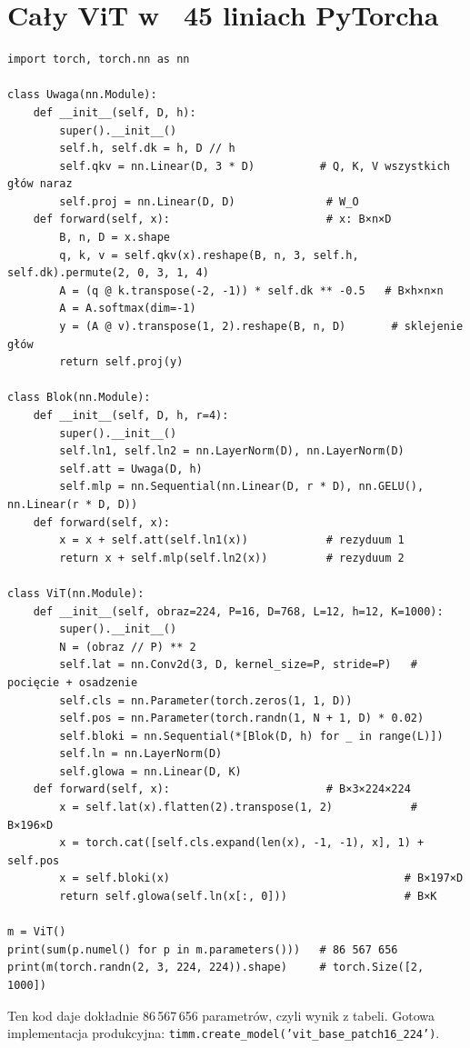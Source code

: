 \documentclass[11pt,a4paper]{article}
\begin{document}
\section{Cały ViT w ~45 liniach PyTorcha}
\begin{lstlisting}
import torch, torch.nn as nn

class Uwaga(nn.Module):
    def __init__(self, D, h):
        super().__init__()
        self.h, self.dk = h, D // h
        self.qkv = nn.Linear(D, 3 * D)          # Q, K, V wszystkich głów naraz
        self.proj = nn.Linear(D, D)              # W_O
    def forward(self, x):                        # x: B×n×D
        B, n, D = x.shape
        q, k, v = self.qkv(x).reshape(B, n, 3, self.h, self.dk).permute(2, 0, 3, 1, 4)
        A = (q @ k.transpose(-2, -1)) * self.dk ** -0.5   # B×h×n×n
        A = A.softmax(dim=-1)
        y = (A @ v).transpose(1, 2).reshape(B, n, D)       # sklejenie głów
        return self.proj(y)

class Blok(nn.Module):
    def __init__(self, D, h, r=4):
        super().__init__()
        self.ln1, self.ln2 = nn.LayerNorm(D), nn.LayerNorm(D)
        self.att = Uwaga(D, h)
        self.mlp = nn.Sequential(nn.Linear(D, r * D), nn.GELU(), nn.Linear(r * D, D))
    def forward(self, x):
        x = x + self.att(self.ln1(x))            # rezyduum 1
        return x + self.mlp(self.ln2(x))         # rezyduum 2

class ViT(nn.Module):
    def __init__(self, obraz=224, P=16, D=768, L=12, h=12, K=1000):
        super().__init__()
        N = (obraz // P) ** 2
        self.lat = nn.Conv2d(3, D, kernel_size=P, stride=P)   # pocięcie + osadzenie
        self.cls = nn.Parameter(torch.zeros(1, 1, D))
        self.pos = nn.Parameter(torch.randn(1, N + 1, D) * 0.02)
        self.bloki = nn.Sequential(*[Blok(D, h) for _ in range(L)])
        self.ln = nn.LayerNorm(D)
        self.glowa = nn.Linear(D, K)
    def forward(self, x):                        # B×3×224×224
        x = self.lat(x).flatten(2).transpose(1, 2)            # B×196×D
        x = torch.cat([self.cls.expand(len(x), -1, -1), x], 1) + self.pos
        x = self.bloki(x)                                    # B×197×D
        return self.glowa(self.ln(x[:, 0]))                  # B×K

m = ViT()
print(sum(p.numel() for p in m.parameters()))   # 86 567 656
print(m(torch.randn(2, 3, 224, 224)).shape)     # torch.Size([2, 1000])
\end{lstlisting}
Ten kod daje dokładnie 86\,567\,656 parametrów, czyli wynik z tabeli. Gotowa implementacja
produkcyjna: \texttt{timm.create\_model('vit\_base\_patch16\_224')}.
\end{document}
